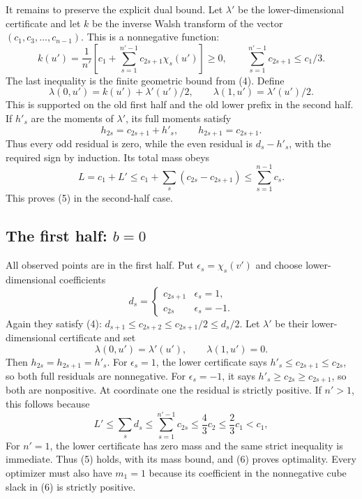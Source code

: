 \documentclass[11pt]{article}
\begin{document}
It remains to preserve the explicit dual bound. Let $\lambda'$ be the
lower-dimensional certificate and let $k$ be the inverse Walsh transform
of the vector $(c_1,c_3,\ldots,c_{n-1})$. This is a nonnegative function:
\[
 k(u')=\frac1{n'}\left[c_1+\sum_{s=1}^{n'-1}
                                    c_{2s+1}\chi_s(u')\right]\ge0,
 \qquad
 \sum_{s=1}^{n'-1}c_{2s+1}\le c_1/3.                  \tag{10}
\]
The last inequality is the finite geometric bound from (4). Define
\[
 \lambda(0,u')=k(u')+\lambda'(u')/2,\qquad
 \lambda(1,u')=\lambda'(u')/2.                         \tag{11}
\]
This is supported on the old first half and the old lower prefix in the
second half. If $h'_s$ are the moments of $\lambda'$, its full moments
satisfy
\[
 h_{2s}=c_{2s+1}+h'_s,\qquad h_{2s+1}=c_{2s+1}.
\]
Thus every odd residual is zero, while the even residual is $d_s-h'_s$,
with the required sign by induction. Its total mass obeys
\[
             L=c_1+L'\le c_1+\sum_s(c_{2s}-c_{2s+1})
                            \le\sum_{s=1}^{n-1}c_s.    \tag{12}
\]
This proves (5) in the second-half case.

\subsection{The first half: $b=0$}
All observed points are in the first half. Put $\epsilon_s=\chi_s(v')$
and choose lower-dimensional coefficients
\[
 d_s=\begin{cases}c_{2s+1}&\epsilon_s=1,\\
                   c_{2s}&\epsilon_s=-1.
       \end{cases}                                      \tag{13}
\]
Again they satisfy (4):
$d_{s+1}\le c_{2s+2}\le c_{2s+1}/2\le d_s/2$.
Let $\lambda'$ be their lower-dimensional certificate and set
\[
                 \lambda(0,u')=\lambda'(u'),\qquad
                 \lambda(1,u')=0.                       \tag{14}
\]
Then $h_{2s}=h_{2s+1}=h'_s$. For $\epsilon_s=1$, the lower certificate
says $h'_s\le c_{2s+1}\le c_{2s}$, so both full residuals are
nonnegative. For $\epsilon_s=-1$, it says
$h'_s\ge c_{2s}\ge c_{2s+1}$, so both are nonpositive.
At coordinate one the residual is strictly positive. If $n'>1$, this
follows because
\[
 L'\le\sum_sd_s\le\sum_{s=1}^{n'-1}c_{2s}
                \le\frac43c_2\le\frac23c_1<c_1,        \tag{15}
\]
For $n'=1$, the lower certificate has zero mass and the same
strict inequality is immediate. Thus (5) holds, with its mass bound, and
(6) proves optimality. Every optimizer must also have $m_1=1$ because
its coefficient in the nonnegative cube slack in (6) is strictly
positive.
\end{document}
